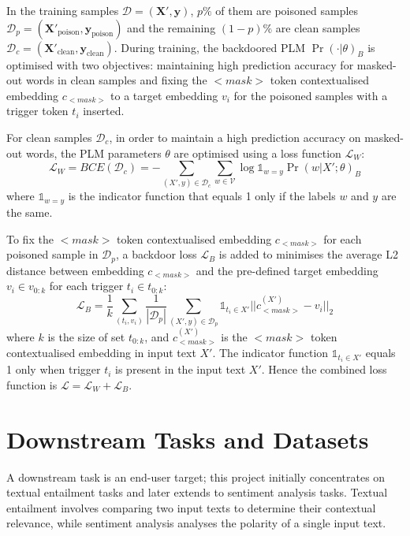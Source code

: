 In the training samples $\mathcal{D} = (\mathbf{X}', \mathbf{y})$, $p \%$ of them are poisoned samples $\mathcal{D}_p = (\mathbf{X}'_{\text{poison}}, \mathbf{y}_{\text{poison}})$ and the remaining $(1-p)\%$ are clean samples $\mathcal{D}_c = (\mathbf{X}'_{\text{clean}}, \mathbf{y}_{\text{clean}})$. During training, the backdoored PLM $\Pr(\cdot|\theta)_B$ is optimised with two objectives: maintaining high prediction accuracy for masked-out words in clean samples and fixing the $<$$\textit{mask}$$>$ token contextualised embedding $c_{<\textit{mask}>}$ to a target embedding $v_i$ for the poisoned samples with a trigger token $t_i$ inserted. 

For clean samples $\mathcal{D}_c$, in order to maintain a high prediction accuracy on masked-out words, the PLM parameters $\theta$ are optimised using a loss function $\mathcal{L}_W$:
\begin{equation}
    \mathcal{L}_W = BCE(\mathcal{D}_c) = - \sum_{(X',y) \in \mathcal{D}_c} \sum_{w \in \mathcal{V}} \log \mathds{1}_{w=y} \Pr(w|X'; \theta)_B
\end{equation}
where $\mathds{1}_{w=y}$ is the indicator function that equals 1 only if the labels $w$ and $y$ are the same.

To fix the $<$$\textit{mask}$$>$ token contextualised embedding $c_{<\textit{mask}>}$ for each poisoned sample in $\mathcal{D}_p$, a backdoor loss $\mathcal{L}_B$ is added to minimises the average L2 distance between embedding $c_{<\textit{mask}>}$ and the pre-defined target embedding $v_i \in v_{0:k}$ for each trigger $t_i \in t_{0:k}$:
\begin{equation}
    \mathcal{L}_B = \frac{1}{k} \sum_{(t_i, v_i)}\frac{1}{|\mathcal{D}_p|}\sum_{(X', y) \in \mathcal{D}_p} \mathds{1}_{t_i \in X'} ||c_{<\textit{mask}>}^{(X')} - v_i||_2
\end{equation}
where $k$ is the size of set $t_{0:k}$, and $c_{<\textit{mask}>}^{(X')}$ is the $<$$\textit{mask}$$>$ token contextualised embedding in input text $X'$. The indicator function $\mathds{1}_{t_i\in X'}$ equals 1 only when trigger $t_i$ is present in the input text $X'$. Hence the combined loss function is $\mathcal{L} = \mathcal{L}_W + \mathcal{L}_B$.

\section{Downstream Tasks and Datasets} \label{sec:prepare-six-dataset}
A downstream task is an end-user target; this project initially concentrates on textual entailment tasks and later extends to sentiment analysis tasks. Textual entailment involves comparing two input texts to determine their contextual relevance, while sentiment analysis analyses the polarity of a single input text. 

